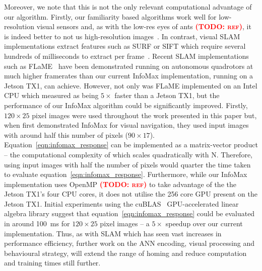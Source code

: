 \documentclass[letterpaper]{article}
\newcommand{\todo}[1]{\textbf{\textsc{\textcolor{red}{(TODO: #1)}}}}
\begin{document}
Moreover, we note that this is not the only relevant computational advantage of our algorithm. 
Firstly, our familiarity based algorithms work well for low-resolution visual sensors and, as with the low-res eyes of ants \todo{ref}, it is indeed better to not us high-resolution images~\citep{Wystrach2016}. 
In contrast, visual SLAM implementations extract features such as SURF or SIFT which require several hundreds of milliseconds to extract per frame~\citep{Bay2006}.
Recent SLAM implementations such as FLaME~\citep{Greene2017} have been demonstrated running on autonomous quadrotors at much higher framerates than our current InfoMax implementation, running on a Jetson TX1, can achieve.
However, not only was FLaME implemented on an Intel CPU which \citet{Biddulph2018} measured as being $5\times$ faster than a Jetson TX1, but the performance of our InfoMax algorithm could be significantly improved.
Firstly, $120 \times 25$ pixel images were used throughout the work presented in this paper but, when \citet{Baddeley2012} first demonstrated InfoMax for visual navigation, they used input images with around half this number of pixels ($90\times 17$). 
Equation~\ref{eqn:infomax_response}  can be implemented as a matrix-vector product -- the computational complexity of which scales quadratically with N. Therefore, using input images with half the number of pixels would quarter the time taken to evaluate equation~\ref{eqn:infomax_response}. 
Furthermore, while our InfoMax implementation uses OpenMP \todo{ref} to take advantage of the the Jetson TX1's four CPU cores, it does not utilise the \num{256} core GPU present on the Jetson TX1. 
Initial experiments using the cuBLAS~\citep{NVIDIACorporation2007} GPU-accelerated linear algebra library suggest that equation~\ref{eqn:infomax_response} could be evaluated in around \SI{100}{\milli\second} for $120 \times 25$ pixel images -- a $5 \times$ speedup over our current implementation.
Thus, as with SLAM which has seen vast increases in performance efficiency, further work on the ANN encoding, visual processing and behavioural strategy, will extend the range of homing and reduce computation and training times still further.
\end{document}
